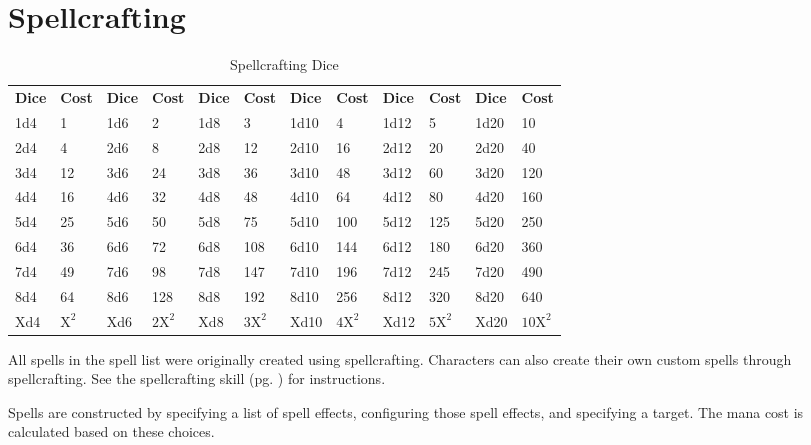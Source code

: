 \section{Spellcrafting}
    \begin{table*}[ht]
        \unclassedrowcolors
        \begin{tabularx}{\textwidth}{l X l X l X l X l X l X}
            \textbf{Dice} & \textbf{Cost} & \textbf{Dice} & \textbf{Cost} & \textbf{Dice} & \textbf{Cost} & \textbf{Dice} & \textbf{Cost} & \textbf{Dice} & \textbf{Cost} & \textbf{Dice} & \textbf{Cost} \\
            1d4 & 1   & 1d6 & 2    & 1d8 & 3    & 1d10 & 4    & 1d12 & 5    & 1d20 & 10    \\
            2d4 & 4   & 2d6 & 8    & 2d8 & 12   & 2d10 & 16   & 2d12 & 20   & 2d20 & 40    \\
            3d4 & 12  & 3d6 & 24   & 3d8 & 36   & 3d10 & 48   & 3d12 & 60   & 3d20 & 120   \\
            4d4 & 16  & 4d6 & 32   & 4d8 & 48   & 4d10 & 64   & 4d12 & 80   & 4d20 & 160   \\
            5d4 & 25  & 5d6 & 50   & 5d8 & 75   & 5d10 & 100  & 5d12 & 125  & 5d20 & 250   \\
            6d4 & 36  & 6d6 & 72   & 6d8 & 108  & 6d10 & 144  & 6d12 & 180  & 6d20 & 360   \\
            7d4 & 49  & 7d6 & 98   & 7d8 & 147  & 7d10 & 196  & 7d12 & 245  & 7d20 & 490   \\
            8d4 & 64  & 8d6 & 128  & 8d8 & 192  & 8d10 & 256  & 8d12 & 320  & 8d20 & 640   \\
            Xd4 & $\text{X}^\text{2}$ & Xd6 & $\text{2X}^\text{2}$ & Xd8 & $\text{3X}^\text{2}$ & Xd10 & $\text{4X}^\text{2}$ & Xd12 & $\text{5X}^\text{2}$ & Xd20 & $\text{10X}^\text{2}$ \\
        \end{tabularx}
        \caption{Spellcrafting Dice}
        \label{tab:spellcrafting-dice}
    \end{table*}

    All spells in the spell list were originally created using spellcrafting.
    Characters can also create their own custom spells through spellcrafting.
    See the spellcrafting skill (pg. \pageref{skill:spellcrafting}) for
    instructions.

    Spells are constructed by specifying a list of spell effects, configuring
    those spell effects, and specifying a target. The mana cost is calculated
    based on these choices.

